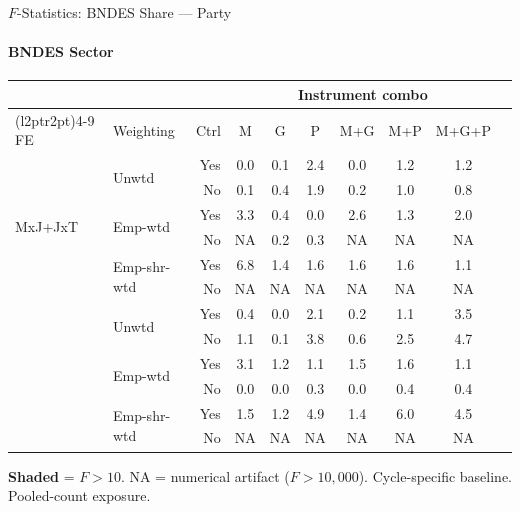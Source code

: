 \documentclass[aspectratio=169,10pt]{beamer}
\begin{document}
\begin{frame}[t]{$F$-Statistics: BNDES Share --- Party}
\framesubtitle{BNDES Sector}
\begin{center}
\footnotesize
\setlength{\tabcolsep}{3.5pt}
\renewcommand{\arraystretch}{1.05}
\begin{tabular}{@{}llrccccccc@{}}
\toprule
 & & & \multicolumn{6}{c}{Instrument combo} \\
\cmidrule(l{2pt}r{2pt}){4-9}
FE & Weighting & Ctrl & M & G & P & M+G & M+P & M+G+P \\
\midrule
  \multirow{6}{*}{MxJ+JxT} & \multirow{2}{*}{Unwtd} & Yes & 0.0 & 0.1 & 2.4 & 0.0 & 1.2 & 1.2 \\
   &  & No & 0.1 & 0.4 & 1.9 & 0.2 & 1.0 & 0.8 \\
   & \multirow{2}{*}{Emp-wtd} & Yes & 3.3 & 0.4 & 0.0 & 2.6 & 1.3 & 2.0 \\
   &  & No & NA & 0.2 & 0.3 & NA & NA & NA \\
   & \multirow{2}{*}{Emp-shr-wtd} & Yes & 6.8 & 1.4 & 1.6 & 1.6 & 1.6 & 1.1 \\
   &  & No & NA & NA & NA & NA & NA & NA \\
\addlinespace[5pt]
  \multirow{6}{*}{MxJ+MxT} & \multirow{2}{*}{Unwtd} & Yes & 0.4 & 0.0 & 2.1 & 0.2 & 1.1 & 3.5 \\
   &  & No & 1.1 & 0.1 & 3.8 & 0.6 & 2.5 & 4.7 \\
   & \multirow{2}{*}{Emp-wtd} & Yes & 3.1 & 1.2 & 1.1 & 1.5 & 1.6 & 1.1 \\
   &  & No & 0.0 & 0.0 & 0.3 & 0.0 & 0.4 & 0.4 \\
   & \multirow{2}{*}{Emp-shr-wtd} & Yes & 1.5 & 1.2 & 4.9 & 1.4 & 6.0 & 4.5 \\
   &  & No & NA & NA & NA & NA & NA & NA \\
\bottomrule
\end{tabular}
\end{center}
{\scriptsize \colorbox{pass}{\textbf{Shaded}} = $F>10$. NA = numerical artifact ($F>10{,}000$). Cycle-specific baseline. Pooled-count exposure.}
\end{frame}

\end{document}
